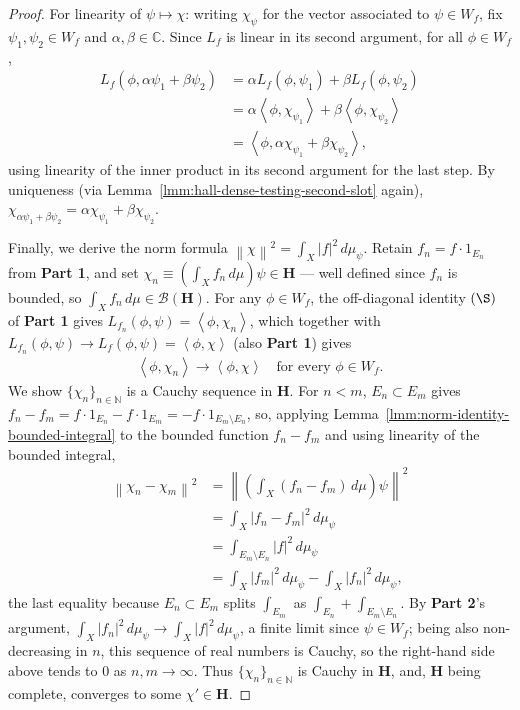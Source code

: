 \begin{proof}
For linearity of $\psi \mapsto \chi$: writing $\chi_\psi$ for the vector associated to $\psi \in W_f$, fix $\psi_1, \psi_2 \in W_f$ and $\alpha, \beta \in \mathbb{C}$. Since $L_f$ is linear in its second argument, for all $\phi \in W_f$,
\begin{align}
    L_f(\phi, \alpha\psi_1 + \beta\psi_2) &= \alpha L_f(\phi, \psi_1) + \beta L_f(\phi, \psi_2) \\
                &= \alpha \left< \phi, \chi_{\psi_1} \right> + \beta \left< \phi, \chi_{\psi_2} \right> \\
                &= \left< \phi, \alpha\chi_{\psi_1} + \beta\chi_{\psi_2} \right>,
\end{align}
using linearity of the inner product in its second argument for the last step. By uniqueness (via Lemma~\ref{lmm:hall-dense-testing-second-slot} again), $\chi_{\alpha\psi_1 + \beta\psi_2} = \alpha\chi_{\psi_1} + \beta\chi_{\psi_2}$.

Finally, we derive the norm formula $\left\| \chi \right\|^2 = \int_X \lvert f \rvert^2 \, d\mu_\psi$. Retain $f_n = f \cdot 1_{E_n}$ from \textbf{Part 1}, and set $\chi_n \equiv \left( \int_X f_n \, d\mu \right)\psi \in \mathbf{H}$ — well defined since $f_n$ is bounded, so $\int_X f_n \, d\mu \in \mathcal{B}(\mathbf{H})$. For any $\phi \in W_f$, the off-diagonal identity $(\S)$ of \textbf{Part 1} gives $L_{f_n}(\phi,\psi) = \left< \phi, \chi_n \right>$, which together with $L_{f_n}(\phi,\psi) \to L_f(\phi,\psi) = \left< \phi, \chi \right>$ (also \textbf{Part 1}) gives
\begin{align}
    \left< \phi, \chi_n \right> \longrightarrow \left< \phi, \chi \right> \quad \text{for every } \phi \in W_f. \tag{$\ddagger$}
\end{align}
We show $\{ \chi_n \}_{n \in \mathbb{N}}$ is a Cauchy sequence in $\mathbf{H}$. For $n < m$, $E_n \subset E_m$ gives $f_n - f_m = f \cdot 1_{E_n} - f \cdot 1_{E_m} = -f \cdot 1_{E_m \setminus E_n}$, so, applying Lemma~\ref{lmm:norm-identity-bounded-integral} to the bounded function $f_n - f_m$ and using linearity of the bounded integral,
\begin{align}
    \left\| \chi_n - \chi_m \right\|^2 &= \left\| \left( \int_X (f_n - f_m) \, d\mu \right)\psi \right\|^2 \\
                &= \int_X \lvert f_n - f_m \rvert^2 \, d\mu_\psi \\
                &= \int_{E_m \setminus E_n} \lvert f \rvert^2 \, d\mu_\psi \\
                &= \int_X \lvert f_m \rvert^2 \, d\mu_\psi - \int_X \lvert f_n \rvert^2 \, d\mu_\psi,
\end{align}
the last equality because $E_n \subset E_m$ splits $\int_{E_m}$ as $\int_{E_n} + \int_{E_m \setminus E_n}$. By \textbf{Part 2}'s argument, $\int_X \lvert f_n \rvert^2 \, d\mu_\psi \to \int_X \lvert f \rvert^2 \, d\mu_\psi$, a finite limit since $\psi \in W_f$; being also non-decreasing in $n$, this sequence of real numbers is Cauchy, so the right-hand side above tends to $0$ as $n, m \to \infty$. Thus $\{ \chi_n \}_{n \in \mathbb{N}}$ is Cauchy in $\mathbf{H}$, and, $\mathbf{H}$ being complete, converges to some $\chi' \in \mathbf{H}$.


\end{proof}
